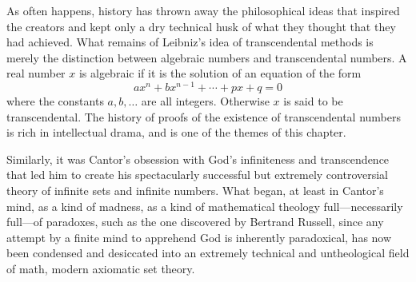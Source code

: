 \documentclass[12pt]{book}
\begin{document}
As often happens, history has thrown away the philosophical ideas that inspired
the creators and kept only a dry technical husk of what they thought that they had achieved.
What remains of Leibniz's idea of transcendental methods is merely the distinction between
algebraic numbers and transcendental numbers.
A real number $x$ is algebraic if it is the solution of an equation of the form
\[
   a x^n + b x^{n-1} + \cdots + p x + q = 0
\] 
where the constants $a, b, \ldots$ are all integers. Otherwise $x$ is said to be transcendental.
The history of proofs of the existence of transcendental numbers is rich in intellectual
drama, and is one of the themes of this chapter.
 
Similarly, it was Cantor's obsession with God's infiniteness and transcendence 
that led him to create his spectacularly successful 
but extremely controversial
theory of infinite sets and infinite numbers.
What began, at least in Cantor's mind, as a kind of madness, 
as a kind of mathematical theology full---necessarily full---of paradoxes, 
such as the one discovered by Bertrand Russell, 
since any attempt by a finite mind to apprehend God is inherently paradoxical,
has now been
condensed and desiccated into an extremely technical and untheological field of math,
modern axiomatic set theory.
 
\end{document}
